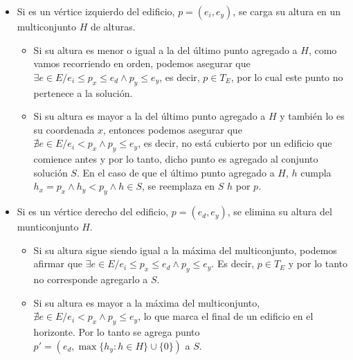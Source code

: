 \begin{itemize}
  \item Si es un vértice izquierdo del edificio, $p = (e_i, e_y)$, se carga su
  altura en un multiconjunto $H$ de alturas.
  \begin{itemize}
    \item Si su altura es menor o igual a la del último punto agregado a $H$,
    como vamos recorriendo en orden, podemos asegurar que $\exists e \in E /
    e_i \leq p_x \leq e_d \land p_y \leq e_y$, es decir, $p \in T_E$, por lo
    cual este punto no pertenece a la solución.

    \item Si su altura es mayor a la del último punto agregado a $H$ y también
    lo es su coordenada $x$, entonces podemos asegurar que $\nexists e \in E /
    e_i < p_x \land p_y \leq e_y$, es decir, no está cubierto por un edificio
    que comience antes y por lo tanto, dicho punto es agregado al conjunto
    solución $S$. En el caso de que el último punto agregado a $H$, $h$
    cumpla $h_x = p_x \wedge h_y < p_y \wedge h \in S$, se reemplaza en $S$
    $h$ por $p$. 

  \end{itemize}

  \item Si es un vértice derecho del edificio, $p = (e_d, e_y)$, se elimina su
  altura del munticonjunto $H$.
  \begin{itemize}
    \item Si su altura sigue siendo igual a la máxima del multiconjunto, podemos
    afirmar que $\exists e \in E / e_i \leq p_x \leq e_d \land p_y \leq
    e_y$. Es decir, $p \in T_E$ y por lo tanto no corresponde agregarlo a
    $S$.

    \item Si su altura es mayor a la máxima del multiconjunto,
    $\nexists e \in E / e_i < p_x \land p_y \leq e_y$, lo que marca el
    final de un edificio en el horizonte. Por lo tanto se agrega punto $p' =
    (e_d, \max\{h_y : h \in H\} \cup \{0\})$ a $S$.
  \end{itemize}
\end{itemize}

